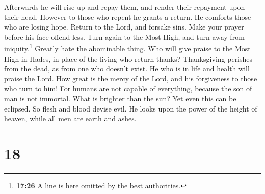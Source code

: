  Afterwards he will rise up and repay them, and render
their repayment upon their head.  However to those who
repent he grants a return. He comforts those who are losing hope.
 Return to the Lord, and forsake sins. Make your prayer
before his face offend less.  Turn again to the Most
High, and turn away from iniquity.\footnote{\textbf{17:26} A line is
  here omitted by the best authorities.} Greatly hate the abominable
thing.  Who will give praise to the Most High in Hades,
in place of the living who return thanks?  Thanksgiving
perishes from the dead, as from one who doesn't exist. He who is in life
and health will praise the Lord.  How great is the mercy
of the Lord, and his forgiveness to those who turn to him!
 For humans are not capable of everything, because the
son of man is not immortal.  What is brighter than the
sun? Yet even this can be eclipsed. So flesh and blood devise evil.
 He looks upon the power of the height of heaven, while
all men are earth and ashes.

\hypertarget{section-14}{%
\section{18}\label{section-14}}


